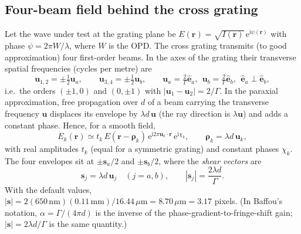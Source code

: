 \documentclass[11pt,a4paper]{article}
\theoremstyle{definition}
\newcommand{\vr}{\bm{r}}
\newcommand{\vs}{\bm{s}}
\newcommand{\vu}{\bm{u}}
\newcommand{\ii}{\mathrm{i}}
\newcommand{\ee}{\mathrm{e}}
\begin{document}
\subsection{Four-beam field behind the cross grating}
Let the wave under test at the grating plane be $E(\vr)=\sqrt{I(\vr)}\,\ee^{\ii\psi(\vr)}$ with phase
$\psi=2\pi W/\lambda$, where $W$ is the OPD. The cross grating transmits (to good approximation) four first-order beams. In the axes of the grating
their transverse spatial frequencies (cycles per metre) are
\begin{equation}
\vu_{1,2}=\pm\tfrac12\vu_a,\qquad \vu_{3,4}=\pm\tfrac12\vu_b,\qquad
\vu_a=\tfrac{2}{\Gamma}\hat{\bm e}_a,\ \ \vu_b=\tfrac{2}{\Gamma}\hat{\bm e}_b,\ \ \hat{\bm e}_a\perp\hat{\bm e}_b ,
\label{eq:beams}
\end{equation}
i.e.\ the orders $(\pm1,0)$ and $(0,\pm1)$ with $|\vu_{1}-\vu_2|=2/\Gamma$.
In the paraxial approximation, free propagation over $d$ of a beam carrying the transverse frequency $\vu$ displaces its envelope by
$\lambda d\,\vu$ (the ray direction is $\lambda\vu$) and adds a constant phase. Hence, for a smooth field,
\begin{equation}
E_k(\vr)\simeq t_k\,E(\vr-\bm\rho_k)\,\ee^{\ii 2\pi\vu_k\cdot\vr}\,\ee^{\ii\chi_k},\qquad
\bm\rho_k=\lambda d\,\vu_k ,
\label{eq:beamfield}
\end{equation}
with real amplitudes $t_k$ (equal for a symmetric grating) and constant phases $\chi_k$. The four envelopes sit at
$\pm\vs_a/2$ and $\pm\vs_b/2$, where the \emph{shear vectors} are
\begin{equation}
\vs_j=\lambda d\,\vu_j\quad(j=a,b),\qquad |\vs_j|=\frac{2\lambda d}{\Gamma}.
\label{eq:shear_phys}
\end{equation}
With the default values, $|\vs|=2(650\,\mathrm{nm})(0.11\,\mathrm{mm})/16.44\,\mu\mathrm{m}=8.70\,\mu\mathrm{m}=3.17$ pixels.
(In Baffou's notation, $\alpha=\Gamma/(4\pi d)$ is the inverse of the phase-gradient-to-fringe-shift gain; $|\vs|=2\lambda d/\Gamma$ is the same quantity.)
\end{document}
